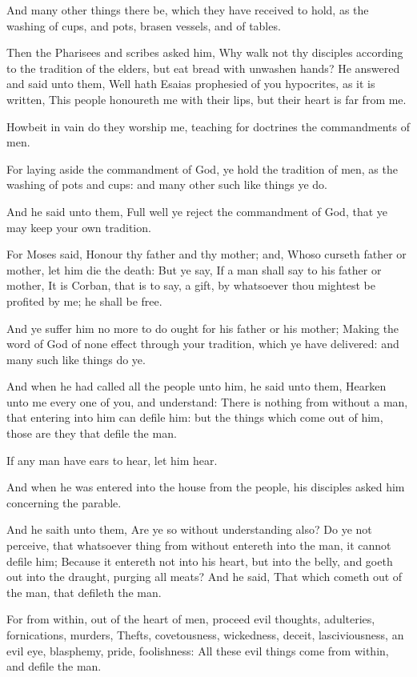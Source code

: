 And many other things there be, which they have received to hold, as the washing of cups, and pots, brasen vessels, and of tables.

\Verse Then the Pharisees and scribes asked him, Why walk not thy disciples according to the tradition of the elders, but eat bread with unwashen hands?  \Verse He answered and said unto them, Well hath Esaias prophesied of you hypocrites, as it is written, This people honoureth me with their lips, but their heart is far from me.

\Verse Howbeit in vain do they worship me, teaching for doctrines the commandments of men.

\Verse For laying aside the commandment of God, ye hold the tradition of men, as the washing of pots and cups: and many other such like things ye do.

\Verse And he said unto them, Full well ye reject the commandment of God, that ye may keep your own tradition.

\Verse For Moses said, Honour thy father and thy mother; and, Whoso curseth father or mother, let him die the death: \Verse But ye say, If a man shall say to his father or mother, It is Corban, that is to say, a gift, by whatsoever thou mightest be profited by me; he shall be free.

\Verse And ye suffer him no more to do ought for his father or his mother; \Verse Making the word of God of none effect through your tradition, which ye have delivered: and many such like things do ye.

\Verse And when he had called all the people unto him, he said unto them, Hearken unto me every one of you, and understand: \Verse There is nothing from without a man, that entering into him can defile him: but the things which come out of him, those are they that defile the man.

\Verse If any man have ears to hear, let him hear.

\Verse And when he was entered into the house from the people, his disciples asked him concerning the parable.

\Verse And he saith unto them, Are ye so without understanding also? Do ye not perceive, that whatsoever thing from without entereth into the man, it cannot defile him; \Verse Because it entereth not into his heart, but into the belly, and goeth out into the draught, purging all meats?  \Verse And he said, That which cometh out of the man, that defileth the man.

\Verse For from within, out of the heart of men, proceed evil thoughts, adulteries, fornications, murders, \Verse Thefts, covetousness, wickedness, deceit, lasciviousness, an evil eye, blasphemy, pride, foolishness: \Verse All these evil things come from within, and defile the man.

